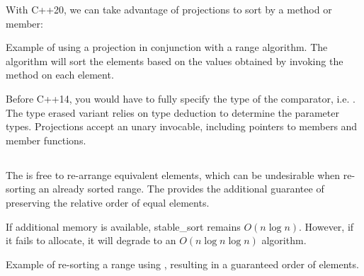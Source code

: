 With C++20, we can take advantage of projections to sort by a method or member:

\begin{codebox}[breakable]{\href{https://compiler-explorer.com/z/4aGenq9b6}{\ExternalLink}}
\footnotesize Example of using a projection in conjunction with a range algorithm. The algorithm will sort the elements based on the values obtained by invoking the method  on each element.
\tcblower
{}
\end{codebox}

Before C++14, you would have to fully specify the type of the comparator, i.e. . The type erased variant  relies on type deduction to determine the parameter types. Projections accept an unary invocable, including pointers to members and member functions.

\subsection{\texorpdfstring{}{\texttt{std::stable\_sort}}}

The  is free to re-arrange equivalent elements, which can be undesirable when re-sorting an already sorted range. The  provides the additional guarantee of preserving the relative order of equal elements.


If additional memory is available, stable\_sort remains $O(n\log n)$. However, if it fails to allocate, it will degrade to an $O(n\log n\log n)$ algorithm.

\begin{codebox}[]{\href{https://compiler-explorer.com/z/TKx8qP8bK}{\ExternalLink}}
\footnotesize Example of re-sorting a range using , resulting in a guaranteed order of elements.
\tcblower
{}
\end{codebox}

\subsection{\texorpdfstring{}{\texttt{std::is\_sorted}}}

